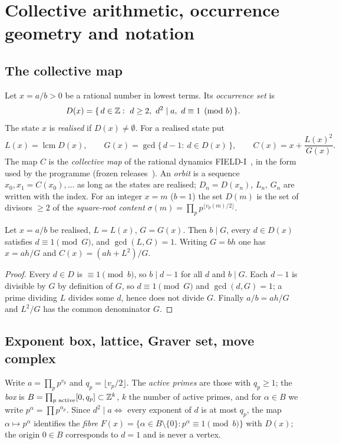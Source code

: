 \section{Collective arithmetic, occurrence geometry and notation}\label{sec:notation}
\subsection{The collective map}
\begin{definition}\label{def:collective}
Let $x=a/b>0$ be a rational number in lowest terms. Its \emph{occurrence set} is
\[
 D(x)=\{\,d\in\Z:\ d\ge2,\ d^2\mid a,\ d\equiv1 \pmod b\,\}.
\]
The state $x$ is \emph{realised} if $D(x)\ne\emptyset$. For a realised state put
\[
 L(x)=\operatorname{lcm}D(x),\qquad G(x)=\gcd\{\,d-1:\ d\in D(x)\,\},\qquad C(x)=x+\frac{L(x)^2}{G(x)} .
\]
The map $C$ is the \emph{collective map} of the rational dynamics FIELD-I~\cite{FoundII}, in the form used by the programme (frozen releases~\cite{RefColl,HD1}). An \emph{orbit} is a sequence $x_0,x_1=C(x_0),\dots$ as long as the states are realised; $D_n=D(x_n)$, $L_n$, $G_n$ are written with the index. For an integer $x=m$ ($b=1$) the set $D(m)$ is the set of divisors $\ge2$ of the \emph{square-root content} $\sigma(m)=\prod_pp^{\lfloor v_p(m)/2\rfloor}$.
\end{definition}

\begin{lemma}\label{lem:basic}
Let $x=a/b$ be realised, $L=L(x)$, $G=G(x)$. Then $b\mid G$, every $d\in D(x)$ satisfies $d\equiv1\pmod G$, and $\gcd(L,G)=1$. Writing $G=bh$ one has $x=ah/G$ and $C(x)=(ah+L^2)/G$.
\end{lemma}
\begin{proof}
Every $d\in D$ is $\equiv1\pmod b$, so $b\mid d-1$ for all $d$ and $b\mid G$. Each $d-1$ is divisible by $G$ by definition of $G$, so $d\equiv1\pmod G$ and $\gcd(d,G)=1$; a prime dividing $L$ divides some $d$, hence does not divide $G$. Finally $a/b=ah/G$ and $L^2/G$ has the common denominator $G$. \qedhere
\end{proof}

\subsection{Exponent box, lattice, Graver set, move complex}
Write $a=\prod_pp^{v_p}$ and $q_p=\lfloor v_p/2\rfloor$. The \emph{active primes} are those with $q_p\ge1$; the \emph{box} is $B=\prod_{p\text{ active}}[0,q_p]\subset\mathbb Z^{k}$, $k$ the number of active primes, and for $\alpha\in B$ we write $p^\alpha=\prod p^{\alpha_p}$. Since $d^2\mid a\iff$ every exponent of $d$ is at most $q_p$, the map $\alpha\mapsto p^\alpha$ identifies the \emph{fibre} $F(x)=\{\alpha\in B\setminus\{0\}:p^\alpha\equiv1 \pmod b\}$ with $D(x)$; the origin $0\in B$ corresponds to $d=1$ and is never a vertex.

